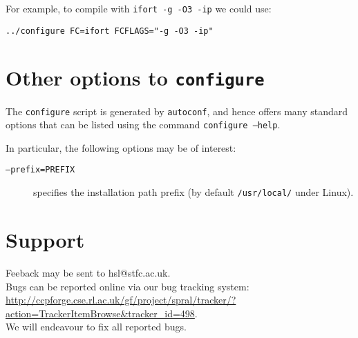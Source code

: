 \noindent
For example, to compile with \texttt{ifort -g -O3 -ip} we could use:
\begin{verbatim}
../configure FC=ifort FCFLAGS="-g -O3 -ip"
\end{verbatim}

\section{Other options to \texttt{configure}}
The \texttt{configure} script is generated by \texttt{autoconf}, and hence
offers many standard options that can be listed using the command
\texttt{configure --help}.

\noindent
In particular, the following options may be of interest:
\begin{description}
   \item[\texttt{--prefix=PREFIX}] specifies the installation path prefix (by default \texttt{/usr/local/} under Linux).
\end{description}

\section{Support}
Feeback may be sent to hsl@stfc.ac.uk.\\
Bugs can be reported online via our bug tracking system: \\
\url{http://ccpforge.cse.rl.ac.uk/gf/project/spral/tracker/?action=TrackerItemBrowse&tracker_id=498}. \\
We will endeavour to fix all reported bugs.
